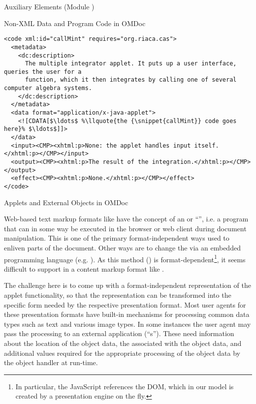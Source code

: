 \begin{tchapter}[id=ext,short=Auxiliary Elements]{Auxiliary Elements (Module {})}
\begin{tsection}[id=private]{Non-XML Data and Program Code in OMDoc}
\begin{lstlisting}[label=lst:callMint,mathescape,escapechar=\%,
  caption={The Program Code for a Java Applet},
  index={code,input,output,effect,data}]
<code xml:id="callMint" requires="org.riaca.cas"> 
  <metadata>
    <dc:description>
      The multiple integrator applet. It puts up a user interface, queries the user for a 
      function, which it then integrates by calling one of several computer algebra systems. 
    </dc:description>
  </metadata>
  <data format="application/x-java-applet">
    <![CDATA[$\ldots$ %\llquote{the {\snippet{callMint}} code goes here}% $\ldots$]]>
  </data> 
  <input><CMP><xhtml:p>None: the applet handles input itself.</xhtml:p></CMP></input> 
  <output><CMP><xhtml:p>The result of the integration.</xhtml:p></CMP></output>
  <effect><CMP><xhtml:p>None.</xhtml:p></CMP></effect> 
</code>
\end{lstlisting}
\end{tsection}

\begin{tsection}[id=applets]{Applets and External Objects in OMDoc}
  
  Web-based text markup formats like {\html} have the concept of an
  {} or ``{}'', i.e.  a program that can in
  some way be executed in the browser or web client during document manipulation. This is
  one of the primary format-independent ways used to enliven parts of the document.  Other
  ways are to change the {} via an embedded programming
  language (e.g.  {}). As this method ({}) is
  format-dependent\footnote{In particular, the JavaScript references the {\html} DOM,
    which in our model is created by a presentation engine on the fly.}, it seems
  difficult to support in a content markup format like {\omdoc}.
  
  The challenge here is to come up with a format-independent representation of the applet
  functionality, so that the {\omdoc} representation can be transformed into the specific
  form needed by the respective presentation format.  Most user agents for these
  presentation formats have built-in mechanisms for processing common data types such as
  text and various image types. In some instances the user agent may pass the processing
  to an external application (``{s}'').  These need information about
  the location of the object data, the {} associated with the object
  data, and additional values required for the appropriate processing of the object data
  by the object handler at run-time.


\end{tsection}
\end{tchapter}
